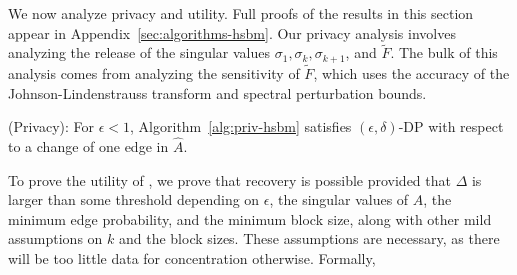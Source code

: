 We now analyze privacy and utility. Full proofs of the results in this section appear in Appendix~\ref{sec:algorithms-hsbm}.
Our privacy analysis involves analyzing the release of the singular values $\sigma_1, \sigma_k, \sigma_{k+1}$, and $\tilde{F}$. The bulk of this analysis comes from analyzing the sensitivity of $\tilde{F}$, which uses the accuracy of the Johnson-Lindenstrauss transform and spectral perturbation bounds.
\begin{thm}\label{thm:com-hsbm-priv}
(Privacy): For $\epsilon < 1$, Algorithm~\ref{alg:priv-hsbm} satisfies $(\epsilon, \delta)$-DP with respect to a change of one edge in $\hat{A}$.
\end{thm}
To prove the utility of \dpcom{}, we prove that recovery is possible provided that $\Delta$ is larger than some threshold depending on $\epsilon$, the singular values of $A$, the minimum edge probability, and the minimum block size, along with other mild assumptions on $k$ and the block sizes. These assumptions are necessary, as there will be too little data for concentration otherwise. Formally,

